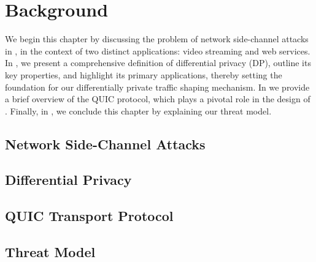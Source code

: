 \chapter{Background}\label{ch:background}





We begin this chapter by discussing the problem of network side-channel attacks in , in the context of two distinct applications: video streaming and web services.
In , we present a comprehensive definition of differential privacy (DP), outline its key properties, and highlight its primary applications, thereby setting the foundation for our differentially private traffic shaping mechanism.
In  we provide a brief overview of the QUIC protocol, which plays a pivotal role in the design of {\sys}.
Finally, in , we conclude this chapter by explaining our threat model. 

\section{Network Side-Channel Attacks}\label{sec:ns-attacks}



\section{Differential Privacy}\label{sec:dp-background}


\section{QUIC Transport Protocol}\label{sec:background-quic}



\section{Threat Model}\label{sec:threat-model}





